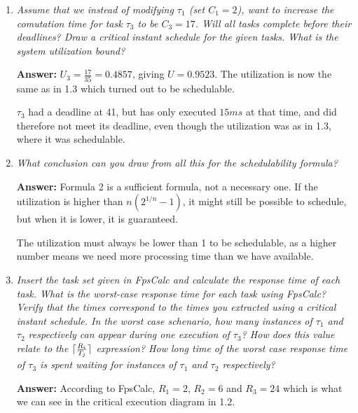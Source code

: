\documentclass[a4paper,10pt]{article}
\DeclarePairedDelimiter{\ceil}{\lceil}{\rceil}
\newcommand{\answer}{\textbf{Answer: }}
\begin{document}
\begin{enumerate}
	\answer $U_1$ is now 0.5, giving us $U = 1.0523$, also not guaranteed to be schedulable. 
	
	
	At time 41, $\tau_3$ should have been finished, but has only executed for $6 ms$ of the total of $10 ms$. Therefore $U_1 = 0.5$ is not schedulable.
	
	\item \emph{Assume that we instead of modifying $\tau_1$ (set $C_1 = 2$), want to increase the comutation time for task $\tau_3$ to be $C_3 = 17$. Will all tasks complete before their deadlines? Draw a critical instant schedule for the given tasks. What is the system utilization bound?}
	
	\answer $U_3 = \frac{17}{35} = 0.4857$, giving $U = 0.9523$. The utilization is now the same as in 1.3 which turned out to be schedulable.
	
	
	$\tau_3$ had a deadline at 41, but has only executed $15 ms$ at that time, and did therefore not meet its deadline, even though the utilization was as in 1.3, where it was schedulable.
	
	\item \emph{What conclusion can you draw from all this for the schedulability formula?}
	
	\answer Formula 2 is a sufficient formula, not a necessary one. If the utilization is higher than $n(2^{1/n}-1)$, it might still be possible to schedule, but when it is lower, it is guaranteed.
	
	The utilization must always be lower than 1 to be schedulable, as a higher number means we need more processing time than we have available.
	
	\item \emph{Insert the task set given in FpsCalc and calculate the response time of each task. What is the worst-case response time for each task using FpsCalc? Verify that the times correspond to the times you extracted using a critical instant schedule. In the worst case schenario, how many instances of $\tau_1$ and $\tau_2$ respectively can appear during one execution of $\tau_3$? How does this value relate to the $\ceil{\frac{R_i}{T_j}}$ expression? How long time of the worst case response time of $\tau_3$ is spent waiting for instances of $\tau_1$ and $\tau_2$ respectively?}
	
	\answer According to FpsCalc, $R_1 = 2$, $R_2 = 6$ and $R_3 = 24$ which is what we can see in the critical execution diagram in 1.2.
	

\end{enumerate}
\end{document}
